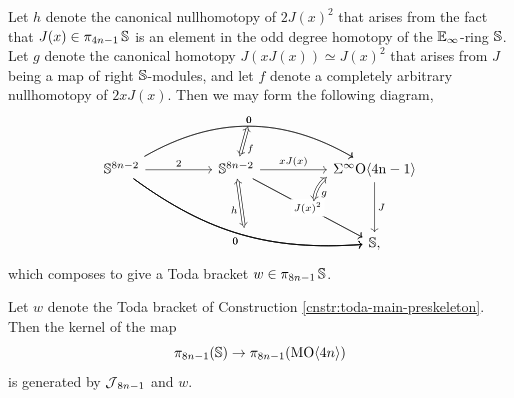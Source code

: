 \begin{cnstr} \label{cnstr:toda-main-preskeleton}
Let $h$ denote the canonical nullhomotopy of $2J(x)^2$ that arises from the fact that $J(x) \in \pi_{4n-1} \operatorname{\mathbb{S}}$ is an element in the odd degree homotopy of the $\operatorname{\mathbb{E}}_{\infty}$-ring $\operatorname{\mathbb{S}}$.  Let $g$ denote the canonical homotopy $J(xJ(x))\simeq J(x)^2$ that arises from $J$ being a map of right $\operatorname{\mathbb{S}}$-modules, and let $f$ denote a completely arbitrary nullhomotopy of $2xJ(x)$.  Then we may form the following diagram,
$$
\begin{tikzcd}[column sep = huge]
\mathbb{S}^{8n-2} \arrow{r}{2}
\arrow[rrdd, bend right=20,""{name=D}] \arrow[rrdd, bend right=20,swap,"0"] \arrow[rr,bend left = 30,""{name=U},"0"]
\arrow[rrdd, bend right=20,""{name=D}] \arrow[rrdd, bend right=20,swap,"0"] \arrow[rr,bend left = 30,""{name=U},"0"]
& \mathbb{S}^{8n-2} \arrow[Leftrightarrow, from=D, "h"] \arrow[Leftrightarrow, from=U, "f"] \arrow{r}{xJ(x)} \arrow[rdd,""{name=MU},"J(x)^2" description] \arrow[rdd,swap, ""{name=MD},"J(x)^2" description]
& \sOf \arrow{dd}{J}  \arrow[bend left=20,Leftrightarrow, from=MU, swap, "g"] \\ \\
& & \mathbb{S}, 
\end{tikzcd}
$$
which composes to give a Toda bracket $w \in \pi_{8n-1} \operatorname{\mathbb{S}}$.
\end{cnstr}

\begin{lem} \label{lem:toda-main-preskeleton}
Let $w$ denote the Toda bracket of Construction \ref{cnstr:toda-main-preskeleton}.
Then the kernel of the map
$$\pi_{8n-1} (\mathbb{S}) \to \pi_{8n-1} (\operatorname{\mathrm{MO}} \langle 4n \rangle)$$
is generated by $\operatorname{\mathcal{J}}_{8n-1}$ and $w$. 
\end{lem}

